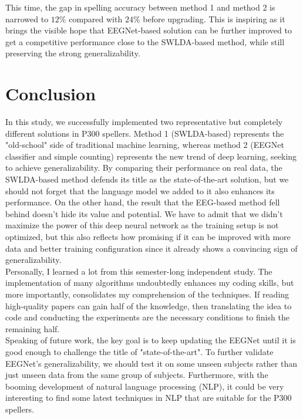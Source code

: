 \documentclass{article}
\begin{document}
\vspace{-3mm}
This time, the gap in spelling accuracy between method 1 and method 2 is narrowed to $12\%$ compared with $24\%$ before upgrading. This is inspiring as it brings the visible hope that EEGNet-based solution can be further improved to get a competitive performance close to the SWLDA-based method, while still preserving the strong generalizability.



\section{Conclusion} \label{Conclusion}
\vspace{-3mm}
In this study, we successfully implemented two representative but completely different solutions in P300 spellers. Method 1 (SWLDA-based) represents the "old-school" side of traditional machine learning, whereas method 2 (EEGNet classifier and simple counting) represents the new trend of deep learning, seeking to achieve generalizability. By comparing their performance on real data, the SWLDA-based method defends its title as the state-of-the-art solution, but we should not forget that the language model we added to it also enhances its performance. On the other hand, the result that the EEG-based method fell behind doesn't hide its value and potential. We have to admit that we didn't maximize the power of this deep neural network as the training setup is not optimized, but this also reflects how promising if it can be improved with more data and better training configuration since it already shows a convincing sign of generalizability.\\

\vspace{-3mm}
Personally, I learned a lot from this semester-long independent study. The implementation of many algorithms undoubtedly enhances my coding skills, but more importantly, consolidates my comprehension of the techniques. If reading high-quality papers can gain half of the knowledge, then translating the idea to code and conducting the experiments are the necessary conditions to finish the remaining half.\\

\vspace{-3mm}
Speaking of future work, the key goal is to keep updating the EEGNet until it is good enough to challenge the title of "state-of-the-art". To further validate EEGNet's generalizability, we should test it on some unseen subjects rather than just unseen data from the same group of subjects. Furthermore, with the booming development of natural language processing (NLP), it could be very interesting to find some latest techniques in NLP that are suitable for the P300 spellers.


{\small }
\end{document}
